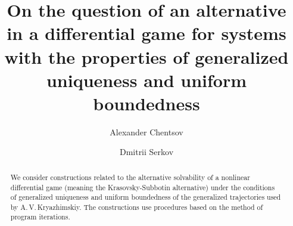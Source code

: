\begin{englishtitle} %
\title{On the question of an alternative in a differential game for systems with the properties of generalized uniqueness and uniform boundedness}
\author{Alexander Chentsov   \and Dmitrii Serkov 
}

\maketitle

\begin{abstract}
We consider constructions related to the alternative solvability of a nonlinear differential game (meaning the Krasovsky-Subbotin alternative) under the conditions of generalized uniqueness and uniform boundedness of the generalized trajectories used by A.\,V.\,Kryazhimskiy.
The constructions use procedures based on the method of program iterations.
\end{abstract}
\end{englishtitle}

\iffalse
%
%

